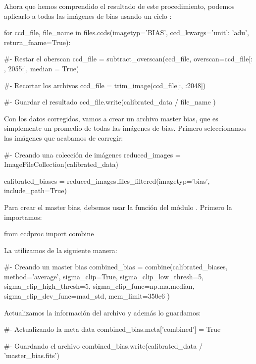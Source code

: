 Ahora que hemos comprendido el resultado de este procedimiento, podemos aplicarlo a todas las imágenes de bias usando un ciclo :

\begin{pyin}
for ccd_file, file_name in files.ccds(imagetyp='BIAS', 
                                      ccd_kwargs={'unit': 'adu'}, 
                                      return_fname=True):

    #- Restar el oberscan
    ccd_file = subtract_overscan(ccd_file, 
                                 overscan=ccd_file[: , 2055:], 
                                 median = True)

    #- Recortar los archivos
    ccd_file = trim_image(ccd_file[:, :2048])

    #- Guardar el resultado
    ccd_file.write(calibrated_data / file_name )
\end{pyin}

Con los datos corregidos, vamos a crear un archivo master bias, que es simplemente un promedio de todas las imágenes de bias. Primero seleccionamos las imágenes que acabamos de corregir:

\begin{pyin}[]
#- Creando una colección de imágenes
reduced_images = ImageFileCollection(calibrated_data)

calibrated_biases = reduced_images.files_filtered(imagetyp='bias', 
                                                  include_path=True)
\end{pyin}

Para crear el master bias, debemos usar la función  del módulo . Primero la importamos:

\begin{pyin}
from ccdproc import combine
\end{pyin}

La utilizamos de la siguiente manera:

\begin{pyin}[]
#- Creando un master bias
combined_bias = combine(calibrated_biases,
                        method='average',
                        sigma_clip=True, sigma_clip_low_thresh=5,
                        sigma_clip_high_thresh=5,
                        sigma_clip_func=np.ma.median, 
                        sigma_clip_dev_func=mad_std,
                        mem_limit=350e6
                        )
\end{pyin}

Actualizamos la información del archivo y además lo guardamos:
\begin{pyin}[]
#- Actualizando la meta data
combined_bias.meta['combined'] = True

#- Guardando el archivo
combined_bias.write(calibrated_data / 'master_bias.fits')
\end{pyin}

